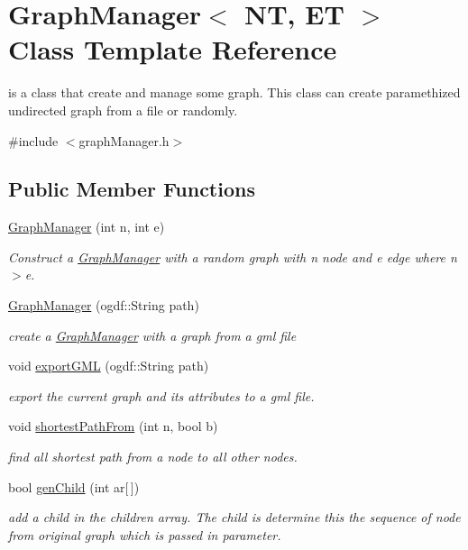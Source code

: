 \hypertarget{classGraphManager}{\section{Graph\-Manager$<$ N\-T, E\-T $>$ Class Template Reference}
\label{classGraphManager}
}


is a class that create and manage some graph. This class can create paramethized undirected graph from a file or randomly.  




{\ttfamily \#include $<$graph\-Manager.\-h$>$}

\subsection*{Public Member Functions}
\begin{DoxyCompactItemize}
\item 
\hyperlink{classGraphManager_a6d93756a38455bea4d5769c304b1c417}{Graph\-Manager} (int n, int e)
\begin{DoxyCompactList}\small\item\em Construct a \hyperlink{classGraphManager}{Graph\-Manager} with a random graph with n node and e edge where n$>$e. \end{DoxyCompactList}\item 
\hyperlink{classGraphManager_ab5a4943d7a92e53835165e24cc6dfbc4}{Graph\-Manager} (ogdf\-::\-String path)
\begin{DoxyCompactList}\small\item\em create a \hyperlink{classGraphManager}{Graph\-Manager} with a graph from a gml file \end{DoxyCompactList}\item 
void \hyperlink{classGraphManager_af56ab92d484e20dcde590da2a86e8513}{export\-G\-M\-L} (ogdf\-::\-String path)
\begin{DoxyCompactList}\small\item\em export the current graph and its attributes to a gml file. \end{DoxyCompactList}\item 
void \hyperlink{classGraphManager_a731caf8a44e09a680cbe1766f0d68291}{shortest\-Path\-From} (int n, bool b)
\begin{DoxyCompactList}\small\item\em find all shortest path from a node to all other nodes. \end{DoxyCompactList}\item 
bool \hyperlink{classGraphManager_a86c24db57fe40798ae7dd9cd3e8d8622}{gen\-Child} (int ar\mbox{[}$\,$\mbox{]})
\begin{DoxyCompactList}\small\item\em add a child in the children array. The child is determine this the sequence of node from original graph which is passed in parameter. \end{DoxyCompactList}\end{DoxyCompactItemize}


